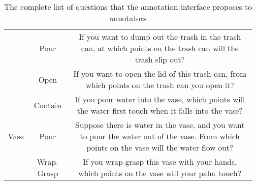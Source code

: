 \documentclass[final]{cvpr}
\begin{document}
\begin{table*}[t]
{\begin{tabular}{c|c|c}
                                      & Pour                & If you want to dump out the trash in the trash can, at which points on the trash can will the trash slip out?                                    \\
                                      & Open                & If you want to open the lid of this trash can, from which points on the trash can you open it?                                                   \\ \hline
    \multirow{3}{*}{Vase}             & Contain             & If you pour water into the vase, which points will the water first touch when it falls into the vase?                                            \\
                                      & Pour                & Suppose there is water in the vase, and you want to pour the water out of the vase. From which points on the vase will the water flow out?       \\
                                      & Wrap-Grasp          & If you wrap-grasp this vase with your hands, which points on the vase will your palm touch?                                                      \\ \hline
    \end{tabular}}
    \caption{The complete list of questions that the annotation interface proposes to annotators}
    \label{complete question list}
\end{table*}
\end{document}
